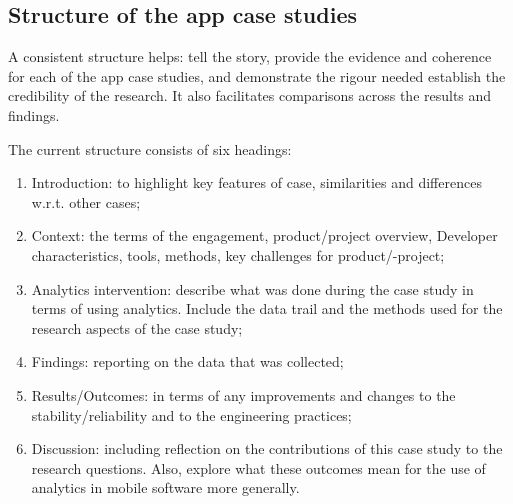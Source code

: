 \subsection{Structure of the app case studies}\label{structure-of-the-app-case-studies}
A consistent structure helps: tell the story, provide the evidence and coherence for each of the app case studies, and demonstrate the rigour needed establish the credibility of the research. It also facilitates comparisons across the results and findings.

The current structure consists of six headings:
\begin{enumerate}
    \itemsep0em
    \item Introduction: to highlight key features of case, similarities and differences w.r.t. other cases;
    \item Context:  the terms of the engagement, product/project overview, Developer characteristics, tools, methods, key challenges for product/-project;
    \item Analytics intervention: describe what was done during the case study in terms of using analytics. Include the data trail and the methods used for the research aspects of the case study;
    \item Findings: reporting on the data that was collected;
    \item Results/Outcomes: in terms of any improvements and changes to the stability/reliability and to the engineering practices;
    \item Discussion: including reflection on the contributions of this case study to the research questions. Also, explore what these outcomes mean for the use of analytics in mobile software more generally.
\end{enumerate}


